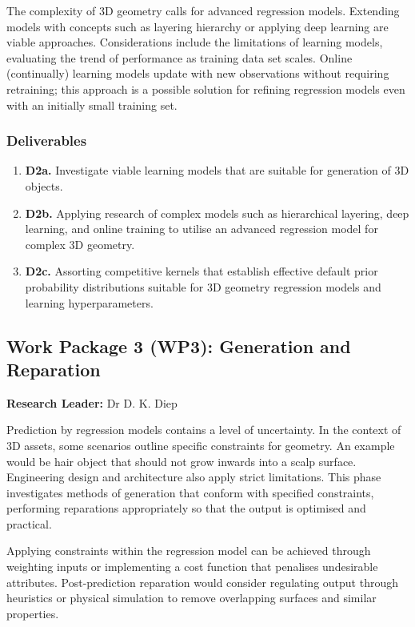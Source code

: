 \documentclass[a4paper, 11pt, onecolumn]{article} %
\numberwithin{equation}{section} %
\numberwithin{figure}{section} %
\numberwithin{table}{section} %
\begin{document}
The complexity of 3D geometry calls for advanced regression models. Extending models with concepts such as layering hierarchy or applying deep learning \cite{deepgp} are viable approaches. Considerations include the limitations of learning models, evaluating the trend of performance as training data set scales. Online (continually) learning models update with new observations without requiring retraining; this approach is a possible solution for refining regression models even with an initially small training set.

\subsubsection*{Deliverables} 
\begin{enumerate}
	\item \textbf{D2a.} Investigate viable learning models that are suitable for generation of 3D objects.
	\item \textbf{D2b.} Applying research of complex models such as hierarchical layering, deep learning, and online training to utilise an advanced regression model for complex 3D geometry.
	\item \textbf{D2c.} Assorting competitive kernels that establish effective default prior probability distributions suitable for 3D geometry regression models and learning hyperparameters.
\end{enumerate}

\subsection*{Work Package 3 (WP3): Generation and Reparation}
\textbf{Research Leader:} Dr D. K. Diep\par

Prediction by regression models contains a level of uncertainty. In the context of 3D assets, some scenarios outline specific constraints for geometry. An example would be hair object that should not grow inwards into a scalp surface. Engineering design and architecture also apply strict limitations. This phase investigates methods of generation that conform with specified constraints, performing reparations appropriately so that the output is optimised and practical. 

Applying constraints within the regression model can be achieved through weighting inputs or implementing a cost function that penalises undesirable attributes.  Post-prediction reparation would consider regulating output through heuristics or physical simulation to remove overlapping surfaces and similar properties.
\end{document}
